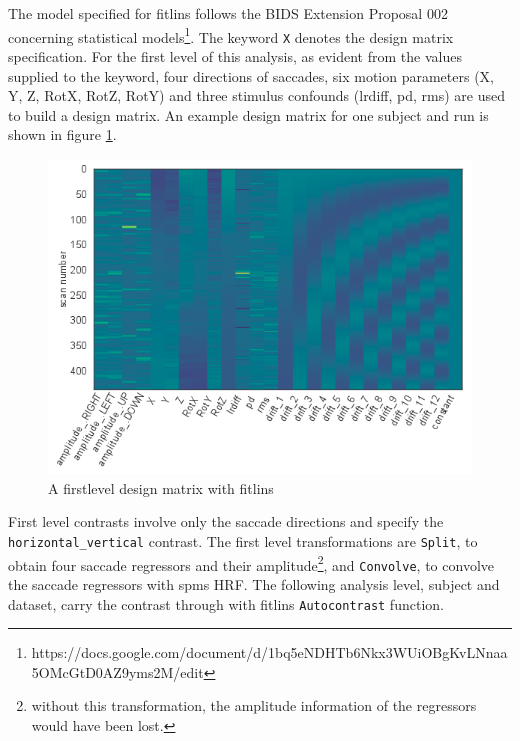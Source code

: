 \documentclass[a4paper, 12pt]{scrreprt}
\begin{document}
\begin{appendices}
The model specified for fitlins follows the BIDS Extension Proposal 002 concerning statistical models\footnote{https://docs.google.com/document/d/1bq5eNDHTb6Nkx3WUiOBgKvLNnaa5OMcGtD0AZ9yms2M/edit}. The keyword \texttt{X} denotes the design matrix specification. For the first level of this analysis, as evident from the values supplied to the keyword, four directions of saccades, six motion parameters (X, Y, Z, RotX, RotZ, RotY) and three stimulus confounds (lrdiff, pd, rms) are used to build a design matrix. An example design matrix for one subject and run is shown in figure \ref{fig:des}. 
\begin{figure}[H]
	\includegraphics[scale=0.5]{img/ex_design.png}
	\caption{A firstlevel design matrix with fitlins}
	\label{fig:des}
\end{figure}

First level contrasts involve only the saccade directions and specify the \texttt{horizontal\_vertical} contrast. The first level transformations are \texttt{Split}, to obtain four saccade regressors and their amplitude\footnote{without this transformation, the amplitude information of the regressors would have been lost.}, and \texttt{Convolve}, to convolve the saccade regressors with spms HRF. The following analysis level, subject and dataset, carry the contrast through with fitlins \texttt{Autocontrast} function.



\end{appendices}
\end{document}
